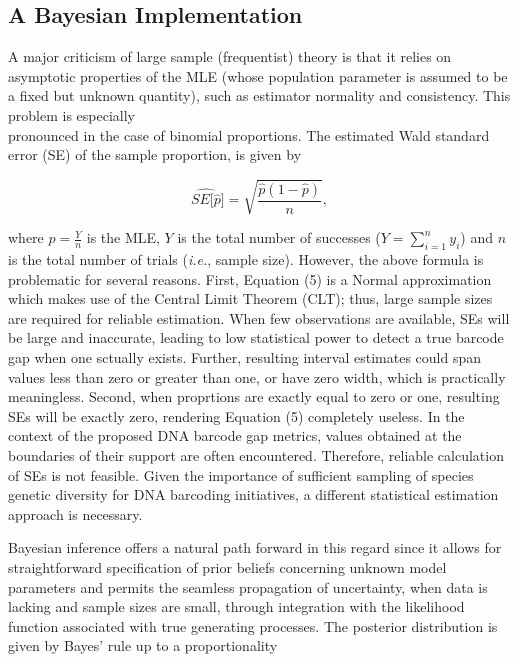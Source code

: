 \documentclass[12pt]{article}
\begin{document}
\subsection{A Bayesian Implementation}

A major criticism of large sample (frequentist) theory is that it relies on asymptotic properties of the MLE (whose population parameter is assumed to be a fixed but unknown quantity), such as estimator normality and consistency. This problem is especially \\ pronounced in the case of binomial proportions. The estimated Wald standard error (SE) of the sample proportion, is given by 

\begin{equation}
\widehat{SE[\hat{p}}] = \sqrt{\frac{\hat{p}(1 - \hat{p})}{n}},
\end{equation}

\noindent where $\hat{p} = \frac{Y}{n}$ is the MLE, $Y$ is the total number of successes ($Y = \sum_{i=1}^n{y_i}$) and $n$ is the total number of trials (\textit{i.e.}, sample size). However, the above formula is problematic for several reasons. First, Equation (5) is a Normal approximation which makes use of the Central Limit Theorem (CLT); thus, large sample sizes are required for reliable estimation. When few observations are available, SEs will be large and inaccurate, leading to low statistical power to detect a true barcode gap when one sctually exists. Further, resulting interval estimates could span values less than zero or greater than one, or have zero width, which is practically meaningless. Second, when proprtions are exactly equal to zero or one, resulting SEs will be exactly zero, rendering Equation (5) completely useless. In the context of the proposed DNA barcode gap metrics, values obtained at the boundaries of their support are often encountered. Therefore, reliable calculation of SEs is not feasible. Given the importance of sufficient sampling of species genetic diversity for DNA barcoding initiatives, a different statistical estimation approach is necessary. 

Bayesian inference offers a natural path forward in this regard since it allows for \\ straightforward specification of prior beliefs concerning unknown model parameters and permits the seamless propagation of uncertainty, when data is lacking and sample sizes are small, through integration with the likelihood function associated with true generating processes. The posterior distribution is given by Bayes' rule up to a proportionality
\end{document}
